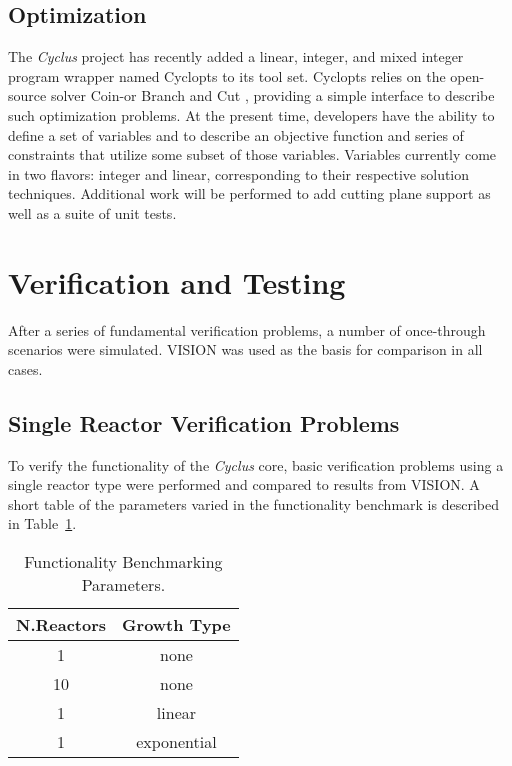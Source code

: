 \documentclass{anstrans}
\begin{document}
\subsection{Optimization}
The \emph{Cyclus} project has recently added a linear, integer, and
mixed integer program wrapper named Cyclopts \cite{cyclopts2012} to
its tool set. Cyclopts relies on the open-source solver Coin-or Branch
and Cut \cite{coinCBC}, providing a simple interface to describe such
optimization problems. At the present time, developers have the
ability to define a set of variables and to describe an objective
function and series of constraints that utilize some subset of those
variables. Variables currently come in two flavors: integer and
linear, corresponding to their respective solution
techniques. Additional work will be performed to add cutting plane
support as well as a suite of unit tests.
\section{Verification and Testing}

After a series of fundamental verification problems, a number of
once-through scenarios were simulated.  VISION was used as the basis
for comparison in all cases.

\subsection{Single Reactor Verification Problems}
To verify the functionality of the \emph{Cyclus} core, basic
verification problems using a single reactor type were performed and
compared to results from VISION.  A short table of the parameters
varied in the functionality benchmark is described in
Table~\ref{tab:scenarioparams}.
\begin{table} [h]
\centering
\begin{tabular} {|c|c|} 
\hline
N.Reactors & Growth Type \\
\hline
1          & none        \\
10         & none        \\
1          & linear      \\
1          & exponential \\
\hline
\end{tabular}
  \caption{Functionality Benchmarking Parameters.}
  \label{tab:scenarioparams}
\end{table}
\end{document}

